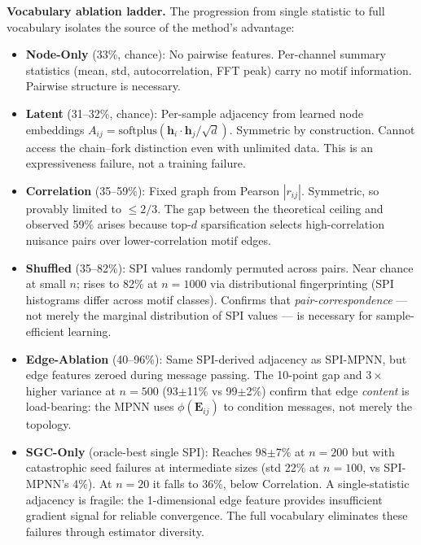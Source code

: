 \documentclass{article}
\begin{document}
\textbf{Vocabulary ablation ladder.} The progression from single statistic to full vocabulary isolates the source of the method's advantage:

\begin{itemize}
\item \textbf{Node-Only} (33\%, chance): No pairwise features. Per-channel summary statistics (mean, std, autocorrelation, FFT peak) carry no motif information. Pairwise structure is necessary.

\item \textbf{Latent} (31--32\%, chance): Per-sample adjacency from learned node embeddings $A_{ij} = \mathrm{softplus}(\mathbf{h}_i \cdot \mathbf{h}_j / \sqrt{d})$. Symmetric by construction. Cannot access the chain--fork distinction even with unlimited data. This is an expressiveness failure, not a training failure.

\item \textbf{Correlation} (35--59\%): Fixed graph from Pearson $|r_{ij}|$. Symmetric, so provably limited to $\leq 2/3$. The gap between the theoretical ceiling and observed 59\% arises because top-$d$ sparsification selects high-correlation nuisance pairs over lower-correlation motif edges.

\item \textbf{Shuffled} (35--82\%): SPI values randomly permuted across pairs. Near chance at small $n$; rises to 82\% at $n{=}1000$ via distributional fingerprinting (SPI histograms differ across motif classes). Confirms that \emph{pair-correspondence} --- not merely the marginal distribution of SPI values --- is necessary for sample-efficient learning.

\item \textbf{Edge-Ablation} (40--96\%): Same SPI-derived adjacency as SPI-MPNN, but edge features zeroed during message passing. The 10-point gap and $3{\times}$ higher variance at $n{=}500$ (93$\pm$11\% vs 99$\pm$2\%) confirm that edge \emph{content} is load-bearing: the MPNN uses $\phi(\mathbf{E}_{ij})$ to condition messages, not merely the topology.

\item \textbf{SGC-Only} (oracle-best single SPI): Reaches 98$\pm$7\% at $n{=}200$ but with catastrophic seed failures at intermediate sizes (std 22\% at $n{=}100$, vs SPI-MPNN's 4\%). At $n{=}20$ it falls to 36\%, below Correlation. A single-statistic adjacency is fragile: the 1-dimensional edge feature provides insufficient gradient signal for reliable convergence. The full vocabulary eliminates these failures through estimator diversity.


\end{itemize}
\end{document}
